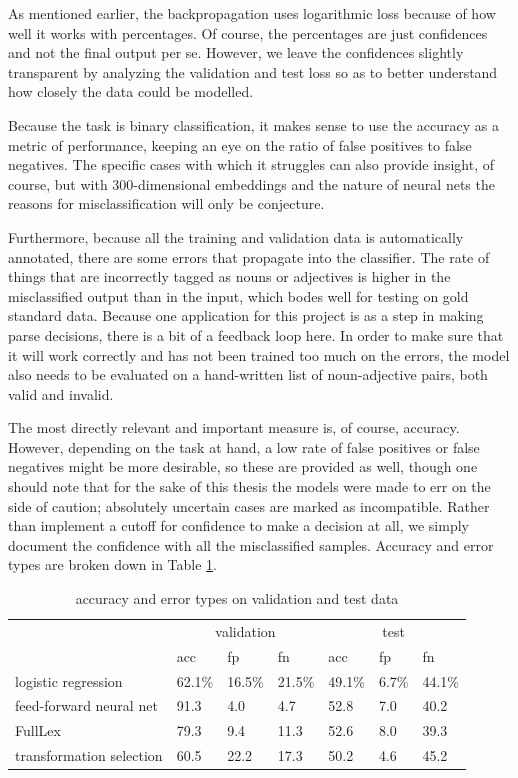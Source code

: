 \documentclass[a4paper, 12pt]{article}
\begin{document}
As mentioned earlier, the backpropagation uses logarithmic loss because of how well it works with percentages. Of course, the percentages are just confidences and not the final output per se. However, we leave the confidences slightly transparent by analyzing the validation and test loss so as to better understand how closely the data could be modelled.

Because the task is binary classification, it makes sense to use the accuracy as a metric of performance, keeping an eye on the ratio of false positives to false negatives. The specific cases with which it struggles can also provide insight, of course, but with 300-dimensional embeddings and the nature of neural nets the reasons for misclassification will only be conjecture.

Furthermore, because all the training and validation data is automatically annotated, there are some errors that propagate into the classifier. The rate of things that are incorrectly tagged as nouns or adjectives is higher in the misclassified output than in the input, which bodes well for testing on gold standard data. Because one application for this project is as a step in making parse decisions, there is a bit of a feedback loop here. In order to make sure that it will work correctly and has not been trained too much on the errors, the model also needs to be evaluated on a hand-written list of noun-adjective pairs, both valid and invalid.

The most directly relevant and important measure is, of course, accuracy. However, depending on the task at hand, a low rate of false positives or false negatives might be more desirable, so these are provided as well, though one should note that for the sake of this thesis the models were made to err on the side of caution; absolutely uncertain cases are marked as incompatible. Rather than implement a cutoff for confidence to make a decision at all, we simply document the confidence with all the misclassified samples. Accuracy and error types are broken down in Table \ref{accuracy-an}.

\begin{table}[]
	\centering
	\begin{tabular}{l|lll|lll}
		                         & \multicolumn{3}{c|}{validation} & \multicolumn{3}{c}{test}  \\
		                         & acc      & fp       & fn        & acc     & fp     & fn     \\ \hline
		logistic regression      & 62.1\%   & 16.5\%   & 21.5\%    & 49.1\%  & 6.7\%  & 44.1\% \\
		feed-forward neural net  & 91.3     & 4.0      & 4.7       & 52.8    & 7.0    & 40.2   \\
		FullLex                  & 79.3     & 9.4      & 11.3      & 52.6    & 8.0    & 39.3   \\
		transformation selection & 60.5     & 22.2     & 17.3      & 50.2    & 4.6    & 45.2
	\end{tabular}
	\caption{accuracy and error types on validation and test data}
	\label{accuracy-an}
\end{table}
\end{document}
